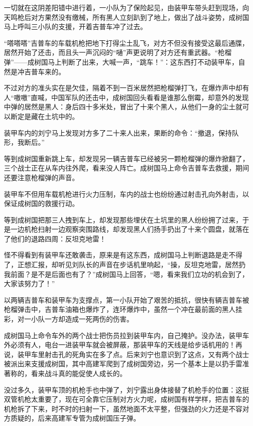 一切就在这阴差阳错中进行着，一小队为了保险起见，由装甲车带头赶到现场，向天鸣枪后对方果然没有缴械，所有黑人立刻趴到了地上，做出了战斗姿势，成树国马上呼叫三小队的支援，开着吉普车冲了过去。

“嗒嗒嗒”吉普车的车载机枪把地下打得尘土乱飞，对方不但没有接受这最后通牒，居然开始了还击，而且头一声沉闷的“嗵”声更说明了对方还有重武器。“枪榴弹”——成树国马上判断了出来，大喊一声，“跳车！”：这东西打不动装甲车，自然是冲吉普车来的。

不过对方的准头实在是欠佳，隔着不到一百米居然把枪榴弹打飞，在爆炸声中却有人“嗷嗷”直喊，中国军队的还击中，成树国回头看看是谁那么倒霉，却意外的发现中弹的居然是黑人：身后四十多米处，冒出了十来个黑人，从他们一身的尘土就可以断定是藏在土坑中的。

装甲车内的刘宁马上发现对方多了二十来人出来，果断的命令：“撤退，保持队形，我断后。”

等到成树国重新跳上车，却发现另一辆吉普车已经被另一颗枪榴弹的爆炸掀翻了，三个战士正在从车内往外爬，看来没人阵亡。成树国马上命令吉普车去救援，期间还要注意枪榴弹的声音。

装甲车不但用车载机枪进行火力压制，车内的战士也纷纷通过射击孔向外射击，以保证成树国的救援行动。

等到成树国把那三人拽到车上，却发现那些埋伏在土坑里的黑人纷纷拥了过来，于是一边机枪扫射一边观察突围路线，却发现黑人们扬手扔出了十来个圆盘，就落在了他们的退路四周：反坦克地雷！

怪不得看到有装甲车还敢袭击，原来是有这东西，成树国马上判断退路是走不得了，正想汇报，却听见刘队长的声音在步话机里响起，“操，反坦克地雷，居然扔我前面？是不是后面也有了？”成树国马上回答，“嗯，看来我们立功的机会到了，大家该努力了！”

以两辆吉普车和装甲车为支撑点，第一小队开始了艰苦的抵抗，很快有辆吉普车被枪榴弹击中，吉普车油箱也爆炸了，连环爆炸中，虽然一个冲在最前面的黑人挂彩，对一小队一方却造成一死两伤的伤害。

成树国马上命令车外的两个战士把伤员拉到装甲车内，自己掩护。没办法，装甲车外必须有人，电台一进装甲车就会被屏蔽，那装甲车的天线是给步话机用的！再说，装甲车里射击孔的死角实在多了点。后来刘宁也意识到了这点，又有两个战士被派出来支援成树国，其中高建军爬到了成树国旁边，另一个基本上是以扔手雷准著称的，看来战斗真的能促使人成长的。

没过多久，装甲车顶的机枪手也中弹了，刘宁露出身体接替了机枪手的位置：这挺双管机枪太重要了，现在可全靠它压制对方火力呢，成树国有样学样，把吉普车的机枪拆了下来，时不时的扫射一下，虽然地面不太平整，但强劲的火力还是不容对方质疑的，后来高建军专管为成树国压子弹。

